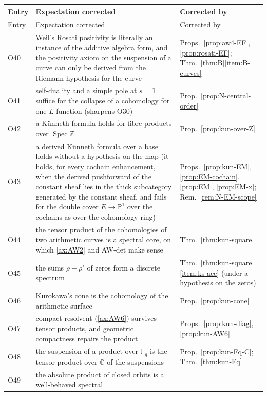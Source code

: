 \documentclass[11pt]{amsart}
\theoremstyle{plain}
\theoremstyle{definition}
\theoremstyle{remark}
\numberwithin{equation}{section}
\newcommand{\C}{\mathbb{C}}
\newcommand{\Z}{\mathbb{Z}}
\newcommand{\F}{\mathbb{F}}
\DeclareMathOperator{\Spec}{Spec}
\begin{document}
\begin{longtable}{@{}l>{\raggedright\arraybackslash}p{}
>{\raggedright\arraybackslash}p{}@{}}
\toprule
Entry & Expectation corrected & Corrected by\\
\midrule
\endfirsthead
\toprule
Entry & Expectation corrected & Corrected by\\
\midrule
\endhead
\bottomrule
\endfoot
O40 & Weil's Rosati positivity is literally an instance of the additive
  algebra form, and the positivity axiom on the suspension of a curve
  can only be derived from the Riemann hypothesis for the curve &
  Props.~\ref{prop:aw4-EF}, \ref{prop:rosati-EF};
  Thm.~\ref{thm:B}\ref{item:B-curves}\\
O41 & self-duality and a simple pole at $s=1$ suffice for the collapse
  of a cohomology for one $L$-function (sharpens O30) &
  Prop.~\ref{prop:N-central-order}\\
O42 & a K\"unneth formula holds for fibre products over $\Spec\Z$ &
  Prop.~\ref{prop:kun-over-Z}\\
O43 & a derived K\"unneth formula over a base holds without a
  hypothesis on the map (it holds, for every cochain enhancement,
  when the derived pushforward of the
  constant sheaf lies in the thick subcategory generated by the
  constant sheaf, and fails for the double cover $E\to\mathbb{P}^1$ over
  the cochains as over the cohomology ring) &
  Props.~\ref{prop:kun-EM}, \ref{prop:EM-cochain}, \ref{prop:EM},
  \ref{prop:EM-x}; Rem.~\ref{rem:N-EM-scope}\\
O44 & the tensor product of the cohomologies of two arithmetic curves is
  a spectral core, on which \ref{ax:AW2} and AW-det make sense &
  Thm.~\ref{thm:kun-square}\\
O45 & the sums $\rho+\rho'$ of zeros form a discrete spectrum &
  Thm.~\ref{thm:kun-square}\ref{item:ks-acc} (under a hypothesis on
  the zeros)\\
O46 & Kurokawa's cone is the cohomology of the arithmetic surface &
  Prop.~\ref{prop:kun-cone}\\
O47 & compact resolvent (\ref{ax:AW6}) survives tensor products, and
  geometric compactness repairs the product &
  Props.~\ref{prop:kun-diag}, \ref{prop:kun-AW6}\\
O48 & the suspension of a product over $\F_q$ is the tensor product over
  $\C$ of the suspensions & Prop.~\ref{prop:kun-Fq-C};
  Thm.~\ref{thm:kun-Fq}\\
O49 & the absolute product of closed orbits is a well-behaved spectral

\end{longtable}
\end{document}
